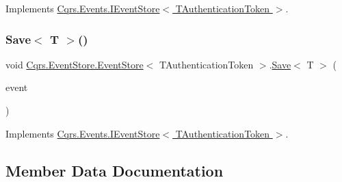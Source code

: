 Implements \hyperlink{interfaceCqrs_1_1Events_1_1IEventStore_a81fb586703e7c6dea6b23d9a95f3887a_a81fb586703e7c6dea6b23d9a95f3887a}{Cqrs.\+Events.\+I\+Event\+Store$<$ T\+Authentication\+Token $>$}.

\mbox{\label{classCqrs_1_1EventStore_1_1EventStore_a7261e5b74f55ef7afd23144c155ba116_a7261e5b74f55ef7afd23144c155ba116}} 
\subsubsection{\texorpdfstring{Save$<$ T $>$()}{Save< T >()}}
{\footnotesize\ttfamily void \hyperlink{classCqrs_1_1EventStore_1_1EventStore}{Cqrs.\+Event\+Store.\+Event\+Store}$<$ T\+Authentication\+Token $>$.\hyperlink{classCqrs_1_1EventStore_1_1EventStore_adce33037e2a3eb81cfccded42ba2ed35_adce33037e2a3eb81cfccded42ba2ed35}{Save}$<$ T $>$ (\begin{DoxyParamCaption}\item[{\hyperlink{interfaceCqrs_1_1Events_1_1IEvent}{I\+Event}$<$ T\+Authentication\+Token $>$ @}]{event }\end{DoxyParamCaption})}



Implements \hyperlink{interfaceCqrs_1_1Events_1_1IEventStore_a92e768243d6602d09b786bbd06811ce6_a92e768243d6602d09b786bbd06811ce6}{Cqrs.\+Events.\+I\+Event\+Store$<$ T\+Authentication\+Token $>$}.



\subsection{Member Data Documentation}
\mbox{\label{classCqrs_1_1EventStore_1_1EventStore_ae9733f8511daf86ae3dac78bcbc5b2f0_ae9733f8511daf86ae3dac78bcbc5b2f0}} 
